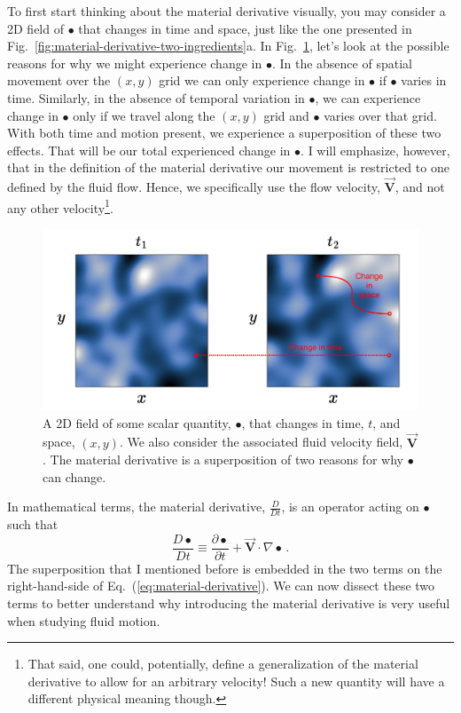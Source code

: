 To first start thinking about the material derivative visually, you may consider a 2D field of $\bullet$ that changes in time and space, just like the one presented in Fig.~\ref{fig:material-derivative-two-ingredients}a. In Fig.~\ref{fig:material-derivative-example}, let's look at the possible reasons for why we might experience change in $\bullet$. In the absence of spatial movement over the $(x,y)$ grid we can only experience change in $\bullet$ if $\bullet$ varies in time. Similarly, in the absence of temporal variation in $\bullet$, we can experience change in $\bullet$ only if we travel along the $(x,y)$ grid and $\bullet$ varies over that grid. With both time and motion present, we experience a superposition of these two effects. That will be our total experienced change in $\bullet$. I will emphasize, however, that in the definition of the material derivative our movement is restricted to one defined by the fluid flow. Hence, we specifically use the flow velocity, $\vec{\bm{V}}$, and not any other velocity\footnote{That said, one could, potentially, define a generalization of the material derivative to allow for an arbitrary velocity! Such a new quantity will have a different physical meaning though.}.
\begin{figure}[H]
\centering\includegraphics[width=15cm]{material-derivative.pdf}
\caption{A 2D field of some scalar quantity, $\bullet$, that changes in time, $t$, and space, $(x, y)$. We also consider the associated fluid velocity field, $\vec{\bm{V}}$. The material derivative is a superposition of two reasons for why $\bullet$ can change.}			
\label{fig:material-derivative-example}
\end{figure}

In mathematical terms, the material derivative, $\frac{D}{Dt}$, is an operator acting on $\bullet$ such that
\begin{equation} \label{eq:material-derivative}
\frac{D \bullet}{D t} \equiv \frac{\partial \bullet}{\partial t} + \vec{\bm{V}} \cdot \nabla \bullet \, .
\end{equation}
The superposition that I mentioned before is embedded in the two terms on the right-hand-side of Eq.~(\ref{eq:material-derivative}). We can now dissect these two terms to better understand why introducing the material derivative is very useful when studying fluid motion.

